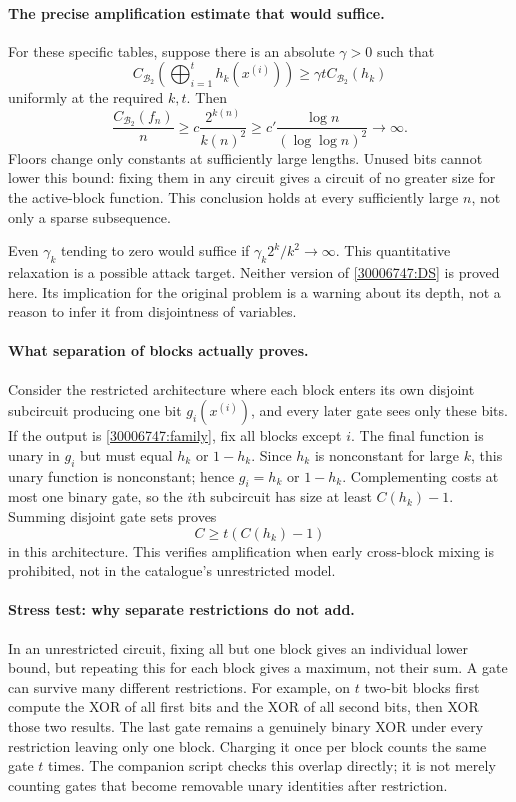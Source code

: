 \documentclass[11pt,a4paper]{article}
\numberwithin{equation}{section}
\begin{document}
\paragraph{The precise amplification estimate that would suffice.}
For these specific tables, suppose there is an absolute $\gamma>0$ such that
\begin{equation}\label{30006747:DS}
 C_{\mathcal B_2}\left(\bigoplus_{i=1}^{t}h_k(x^{(i)})\right)
       \ge\gamma t C_{\mathcal B_2}(h_k)
\end{equation}
uniformly at the required $k,t$. Then
\[
 \frac{C_{\mathcal B_2}(f_n)}n
 \ge c\frac{2^{k(n)}}{k(n)^2}
 \ge c'\frac{\log n}{(\log\log n)^2}\longrightarrow\infty.
\]
Floors change only constants at sufficiently large lengths. Unused bits
cannot lower this bound: fixing them in any circuit gives a circuit of no
greater size for the active-block function. This conclusion holds at every
sufficiently large $n$, not only a sparse subsequence.

Even $\gamma_k$ tending to zero would suffice if
$\gamma_k2^k/k^2\to\infty$. This quantitative relaxation is a possible
attack target. Neither version of \eqref{30006747:DS} is proved here. Its
implication for the original problem is a warning about its depth, not a
reason to infer it from disjointness of variables.

\paragraph{What separation of blocks actually proves.}
Consider the restricted architecture where each block enters its own disjoint
subcircuit producing one bit $g_i(x^{(i)})$, and every later gate sees only
these bits. If the output is \eqref{30006747:family}, fix all blocks except $i$.
The final function is unary in $g_i$ but must equal $h_k$ or $1-h_k$.
Since $h_k$ is nonconstant for large $k$, this unary function is nonconstant;
hence $g_i=h_k$ or $1-h_k$. Complementing costs at most one binary gate, so
the $i$th subcircuit has size at least $C(h_k)-1$. Summing disjoint gate
sets proves
\[
 C\ge t(C(h_k)-1)
\]
in this architecture. This verifies amplification when early cross-block
mixing is prohibited, not in the catalogue's unrestricted model.

\paragraph{Stress test: why separate restrictions do not add.}
In an unrestricted circuit, fixing all but one block gives an individual
lower bound, but repeating this for each block gives a maximum, not their
sum. A gate can survive many different restrictions. For example, on $t$ two-bit blocks first compute the XOR of all first
bits and the XOR of all second bits, then XOR those two results. The last
gate remains a genuinely binary XOR under every restriction leaving only
one block. Charging it once per block counts the same gate $t$ times.
The companion script checks this overlap directly; it is not merely
counting gates that become removable unary identities after restriction.
\end{document}
